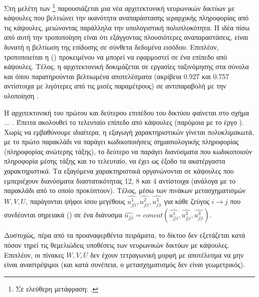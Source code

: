 \subsubsection{}

Στη μελέτη των  \footnote{Σε ελεύθερη μετάφραση: .} \cite{xiang2018ms} παρουσιάζεται μια νέα αρχιτεκτονική νευρωνικών δικτύων με κάψουλες που βελτιώνει την ικανότητα αναπαράστασης ιεραρχικής πληροφορίας από τις κάψουλες, μειώνοντας παράλληλα την υπολογιστική πολυπλοκότητα. Η ιδέα πίσω από αυτή την τροποποίηση είναι ότι εξάγγοντας πλουσιότερες αναπαραστάσεις, είναι δυνατή η βελτίωση της επίδοσης σε σύνθετα δεδομένα εισόδου. Επιπλέον, τροποποιείται η  () προκειμένου να μπορεί να εφαρμοστεί σε ένα επίπεδο από κάψουλες. Τέλος, η αρχιτεκτονική δοκιμάζεται σε εργασίες ταξινόμησης στα σύνολα  και  όπου παρατηρούνται βελτιωμένα αποτελέσματα (ακρίβεια 0.927 και 0.757 αντίστοιχα με λιγότερες από τις μισές παραμέτρους) σε αντιπαραβολή με την υλοποίηση \cite{sabour2017dynamic}.\par

Η αρχιτεκτονική του πρώτου και δεύτερου επιπέδου του δικτύου φαίνεται στο σχήμα ...  . Έπειτα ακολουθεί το τελευταίο επίπεδο από κάψουλες (παρόμοια με το έργο \cite{sabour2017dynamic}). Χωρίς να εμβαθύνουμε ιδιαίτερα, η εξαγωγή χαρακτηριστικών γίνεται πολυκλιμακωτά, με το πρώτο παρακλάδι να παράγει κωδικοποιήσεις σημασιολογικής πληροφορίας (πληροφορίας ανώτερης τάξης), το δεύτερο να παράγει διανύσματα που κωδικοποιούν πληροφορία μέσης τάξης και το τελευταίο, να έχει ως έξοδο τα ακατέργαστα χαρακτηριστικά. Τα εξαγόμενα χαρακτηριστικά οργανώνονται σε κάψουλες που εμπεριέχουν διανύσματα διαστατικότητας 12, 8 και 4 αντίστοιχα (ανάλογα με το παρακλάδι από το οποίο προκύπτουν). Τέλος, μέσω των πινάκων μετασχηματισμών $W, V, U$, παράγονται ψήφοι ίσου μεγέθους  $\hat{u^1_{j|i}}, \hat{u^2_{j|i}}, \hat{u^3_{j|i}}$ για κάθε ζεύγος $i \rightarrow j$ που συνδέονται σηρειακά () σε ένα διάνυσμα $\hat{u_{j|i}} = concat(\hat{u^1_{j|i}}, \hat{u^2_{j|i}}, \hat{u^3_{j|i}})$.\par

Δυστυχώς, πέρα από τα προαναφερθέντα πειράματα, το δίκτυο δεν εξετάζεται κατά πόσον τηρεί τις θεμελιώδεις υποθέσεις των νευρωνικών δικτύων με κάψουλες. Επιπλέον, οι πίνακες $W, V, U$ δεν έχουν τετραγωνική μορφή με αποτέλεσμα να μην είναι αναστρέψιμοι (και κατά συνέπεια, ο μετασχηματισμός δεν είναι γεωμετρικός).


